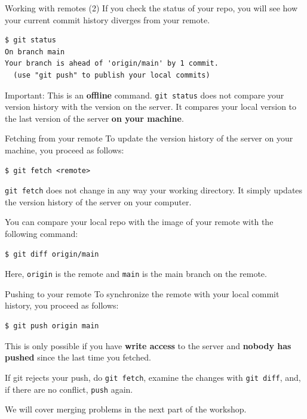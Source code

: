 \documentclass[handout]{beamer}
\begin{document}
\begin{frame}[fragile]{Working with remotes (2)}
If you check the status of your repo, you will see how your current commit history diverges from your remote. 
\begin{lstlisting}
$ git status
On branch main
Your branch is ahead of 'origin/main' by 1 commit.
  (use "git push" to publish your local commits)
\end{lstlisting}

\alert{Important:} This is an \textbf{offline} command. \texttt{git status} does not compare your version history with the version on the server. It compares your local version to the last version of the server \textbf{on your machine}. 

\end{frame}

\begin{frame}[fragile]{Fetching from your remote}
To update the version history of the server on your machine, you proceed as follows: 
\begin{lstlisting}
$ git fetch <remote>
\end{lstlisting}
\texttt{git fetch} does not change in any way your working directory. It simply updates the version history of the server on your computer. 

\vspace{0.5cm}

You can compare your local repo with the image of your remote with  the following command:

\begin{lstlisting}
$ git diff origin/main
\end{lstlisting}

Here, \texttt{origin} is the remote and \texttt{main} is the main branch on the remote. 

\end{frame}

\begin{frame}[fragile]{Pushing to your remote}
To synchronize the remote with your local commit history, you proceed as follows: 
\begin{lstlisting}
$ git push origin main
\end{lstlisting}

This is only possible if you have \textbf{write access} to the server and \textbf{nobody has pushed} since the last time you fetched. 

\vspace{0.5cm}

If git rejects your push, do \texttt{git fetch}, examine the changes with \texttt{git diff}, and,  if there are no conflict, \texttt{push} again. 

\vspace{0.5cm}

We will cover merging problems in the next part of the workshop. 

\end{frame}
\end{document}
